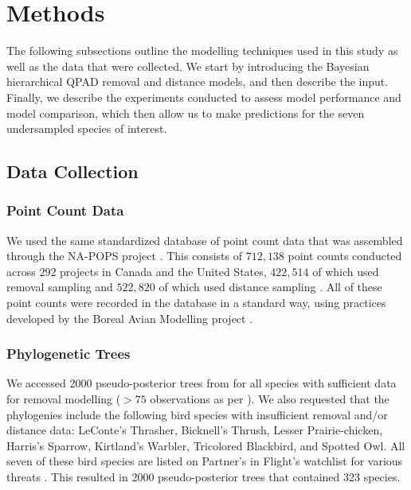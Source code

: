 \documentclass[12pt]{article}
\begin{document}
\section{Methods}

\par The following subsections outline the modelling techniques used in this study as well as the data that were collected. 
We start by introducing the Bayesian hierarchical QPAD removal and distance models, and then describe the input.
Finally, we describe the experiments conducted to assess model performance and model comparison, which then allow us to make predictions for the seven undersampled species of interest.

\subsection{Data Collection}
\subsubsection{Point Count Data}
\par We used the same standardized database of point count data that was assembled through the NA-POPS project \cite{edwards_point_2023}. 
This consists of $712,138$ point counts conducted across $292$ projects in Canada and the United States, $422,514$ of which used removal sampling \citep{alldredge_time--detection_2007, farnsworth_removal_2002} and $522,820$ of which used distance sampling \citep{buckland_introduction_2001, buckland_distance_2015}.
All of these point counts were recorded in the database in a standard way, using practices developed by the Boreal Avian Modelling project \citep{barker_ecological_2015}.

\subsubsection{Phylogenetic Trees}
\par We accessed 2000 pseudo-posterior trees from \citet{jetz_global_2012} for all species with sufficient data for removal modelling ($>75$ observations as per \cite{edwards_point_2023,solymos_evaluating_2018,buckland_introduction_2001}). 
We also requested that the phylogenies include the following bird species with insufficient removal and/or distance data: LeConte's Thrasher, Bicknell's Thrush, Lesser Prairie-chicken, Harris's Sparrow, Kirtland's Warbler, Tricolored Blackbird, and Spotted Owl. 
All seven of these bird species are listed on Partner's in Flight's watchlist for various threats \citep{will_handbook_2020}. 
This resulted in 2000 pseudo-posterior trees that contained 323 species.
\end{document}
